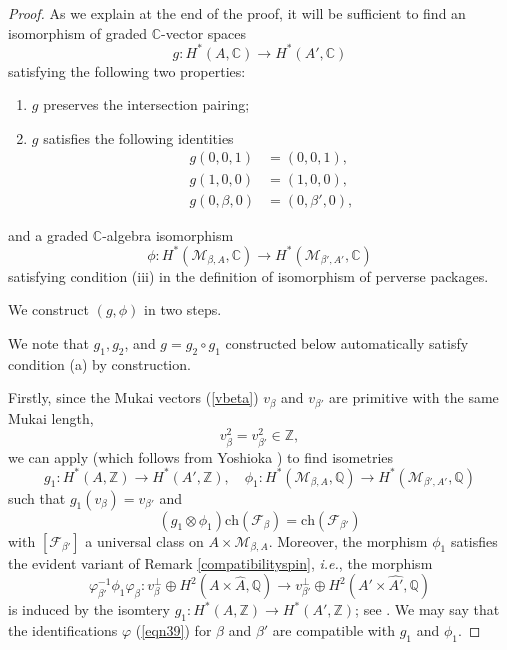 \documentclass[11pt]{amsart}
\theoremstyle{plain}
\theoremstyle{definition}
\theoremstyle{remark}
\newcommand{\BC}{{\mathbb{C}}}
\newcommand{\BQ}{{\mathbb{Q}}}
\newcommand{\BZ}{{\mathbb{Z}}}
\newcommand{\CF}{{\mathcal F}}
\newcommand{\CM}{{\mathcal M}}
\begin{document}
\begin{proof}

As we explain at the end of the proof, it will be sufficient to find an isomorphism of  graded $\BC$-vector spaces
\begin{equation}\label{39}
g: H^*(A, \BC)  \to H^*(A', \BC)
\end{equation}
satisfying the following two properties:
\begin{enumerate}
    \item[(a)] $g$ preserves the intersection pairing;
    \item[(b)] {$g$ satisfies the following identities}
    \begin{equation}\label{40}
    \begin{split}
        g(0,0,1) & = (0,0,1),\\
        g(1,0,0) & = (1,0,0),\\
        g(0,\beta,0) & = (0, \beta',0),
    \end{split}
    \end{equation}
\end{enumerate}
and a {graded $\BC$-algebra  isomorphism}
 \begin{equation}\label{fi}
 \phi : H^*(\CM_{\beta,A}, \BC) \to H^*(\CM_{\beta', A'}, \BC)
 \end{equation}
satisfying  condition (iii) {in the definition of isomorphism of perverse packages.}

We construct $(g, \phi)$ in two steps. 

{We note that $g_1,g_2$, and $ g=g_2\circ g_1$ constructed below automatically satisfy condition (a)
by construction.}

Firstly, since the Mukai vectors (\ref{vbeta})  $v_\beta$ and $v_{\beta'}$ are primitive with the same Mukai length, 
\[
v_\beta^2 = v_{\beta'}^2 \in \BZ,
\]
we can apply \cite[Theorem 8.3]{Markman3} (which follows from Yoshioka \cite{Yo}) to find
{isometries}
\[ g_1: H^*(A, \BZ)  \to H^*(A', \BZ) ,\quad \phi_1: H^*(\CM_{\beta,A}, \BQ) \to H^*(\CM_{\beta', A'}, \BQ)\]
such that $g_1(v_\beta) = v_{\beta'}$ and
\begin{equation}\label{eq41}
(g_1 \otimes \phi_1) \mathrm{ch}(\CF_\beta) = \mathrm{ch}(\CF_{\beta'})
\end{equation}
with $[\CF_{\beta'}]$ a universal class on $A \times \CM_{\beta,A}$. Moreover, the morphism $\phi_1$ satisfies the evident variant of Remark \ref{compatibilityspin}, \emph{i.e.}, the morphism 
\[
\varphi_{\beta'}^{-1}\phi_1 \varphi_\beta: v_\beta^\perp \oplus H^2(A\times \hat{A},\BQ) 
\to v_{\beta'}^\perp \oplus H^2(A'\times \hat{A'},\BQ)
\]
is induced by the isomtery $g_1: H^*(A, \BZ) \to H^*(A', \BZ)$; see  \cite[Proposition 8.5]{Markman2}. We may say that the identifications $\varphi$ (\ref{eqn39}) for $\beta$ and $\beta'$ are compatible with $g_1$ and $\phi_1$.



\end{proof}
\end{document}
